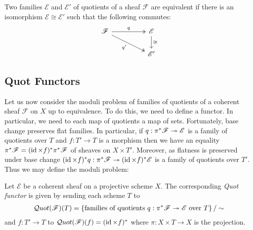 \documentclass[12pt]{ociamthesis}  %
\begin{document}
Two families $\mathscr E$ and $\mathscr E'$ of quotients of a
sheaf $\mathscr F$ are equivalent if there is an isomorphism
$\mathscr E\cong\mathscr E'$ such that the following commutes:
\begin{equation}\label{eq:quotient_equivalence}
  \begin{tikzcd}
    {\mathscr F} && {\mathscr E} \\
    && {\mathscr E'}
    \arrow["q", two heads, from=1-1, to=1-3]
    \arrow["{q'}"', two heads, from=1-1, to=2-3]
    \arrow["\cong", from=1-3, to=2-3]
  \end{tikzcd}
\end{equation}

\subsection{Quot Functors}

Let us now consider the moduli problem of families of
quotients of a coherent sheaf $\mathscr F$ on $X$ up to equivalence.
To do this, we need to define a functor. In particular, we need to
each map of quotients a map of sets. Fortunately, base change preserves flat families.
In particular,
if $q : \pi^*\mathscr F \twoheadrightarrow \mathscr E$ is a family of quotients over $T$ and
$f : T' \to T$ is a morphism then we have an equality
$\pi^*\mathscr F = (\operatorname{id}\times f)^*\pi^*\mathscr F$
of sheaves on $X\times T'$.
Moreover, as flatness is preserved under base change \cite[\href{https://stacks.math.columbia.edu/tag/01U9}{Tag 01U9}]{stacks-project}
$(\operatorname{id}\times f)^*q : \pi^*\mathscr F \twoheadrightarrow (\operatorname{id}\times f)^*\mathscr E$
is a family of quotients over $T'$. Thus we may define the moduli problem:

\begin{definition}
  Let $\mathscr E$ be a coherent sheaf on a projective scheme $X$.
  The corresponding \emph{Quot functor} is given by sending each
  scheme $T$ to
  \begin{align*}
    \mathcal Quot (\mathscr F)(T) = \left\lbrace{
      \text{families of quotients $q : \pi^*\mathscr F \twoheadrightarrow \mathscr E$
        over $T$}
    }\right\rbrace / \sim
  \end{align*}
  and $f : T' \to T$ to
  $\mathcal Quot(\mathscr F)(f) = (\operatorname{id} \times f)^*$ where
  $\pi:X\times T\to X$ is the projection.
\end{definition}
\end{document}
